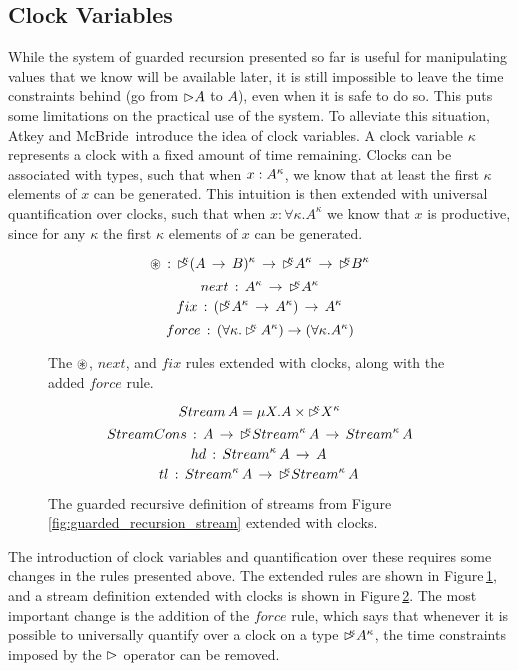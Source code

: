 \subsection{Clock Variables}
While the system of guarded recursion presented so far is useful for manipulating values that we know will be available later, it is still impossible to leave the time constraints behind (go from $\rhd A$ to $A$), even when it is safe to do so. This puts some limitations on the practical use of the system. To alleviate this situation, Atkey and McBride\,\citep{Atkey:2013} introduce the idea of clock variables. A clock variable $\kappa$ represents a clock with a fixed amount of time remaining. Clocks can be associated with types, such that when $x : A^\kappa$, we know that at least the first $\kappa$ elements of $x$ can be generated. This intuition is then extended with universal quantification over clocks, such that when $x : \forall\kappa. A^\kappa$ we know that $x$ is productive, since for any $\kappa$ the first $\kappa$ elements of $x$ can be generated. 
\begin{figure}
\[
\tensor \, :\, \laterk{(A\, \rightarrow \, B)}\, \rightarrow \, \laterk{A}\, \rightarrow \, \laterk{B}
\]
\[
next \, :\, A^\kappa \, \rightarrow \, \rhd^{\!\!\!\kappa}A^\kappa
\]
\[
fix\, :\, (\rhd^{\!\!\!\kappa}A^\kappa\, \rightarrow \, A^\kappa)\, \rightarrow \, A^\kappa
\]
\[
force \, :\, (\forall\kappa.\rhd^{\!\!\!\kappa}A^\kappa) \rightarrow (\forall\kappa.A^\kappa)
\]
\caption{The $\circledast$, $next$, and $fix$ rules extended with clocks, along with the added $force$ rule.}
\label{fig:guarded_recursion_rules_clocks}
\end{figure}
\begin{figure}
\[
Stream\,A = \mu X. A \times \rhd^{\!\!\!\kappa}X^\kappa
\]
\[
StreamCons\, :\, A\, \rightarrow \, \rhd^{\!\!\!\kappa}Stream^\kappa\, A\, \rightarrow \, Stream^\kappa\, A
\]
\[
hd \, : \, Stream^\kappa\,A\, \rightarrow \, A \, 
\]
\[
tl \, : \, Stream^\kappa\, A\, \rightarrow \,\rhd^{\!\!\!\kappa}Stream^\kappa\, A \, 
\]
\caption{The guarded recursive definition of streams from Figure\,\ref{fig:guarded_recursion_stream} extended with clocks.}
\label{fig:guarded_recursion_stream_clocks}
\end{figure}
The introduction of clock variables and quantification over these requires some changes in the rules presented above. The extended rules are shown in Figure\,\ref{fig:guarded_recursion_rules_clocks}, and a stream definition extended with clocks is shown in Figure\,\ref{fig:guarded_recursion_stream_clocks}. The most important change is the addition of the $force$ rule, which says that whenever it is possible to universally quantify over a clock on a type $\rhd^{\!\!\!\kappa}A^\kappa$, the time constraints imposed by the $\rhd$ operator can be removed.
